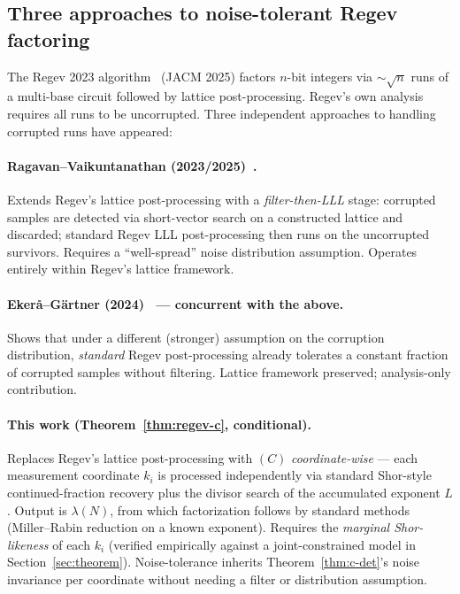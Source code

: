 \documentclass[11pt]{article}
\begin{document}
\subsection{Three approaches to noise-tolerant Regev factoring}

The Regev 2023 algorithm~\cite{regev2023} (JACM 2025) factors $n$-bit integers via $\sim \sqrt{n}$ runs of a multi-base circuit followed by lattice post-processing. Regev's own analysis requires all runs to be uncorrupted. Three independent approaches to handling corrupted runs have appeared:

\paragraph{Ragavan--Vaikuntanathan (2023/2025)~\cite{ragavan2023}.}
Extends Regev's lattice post-processing with a \emph{filter-then-LLL} stage: corrupted samples are detected via short-vector search on a constructed lattice and discarded; standard Regev LLL post-processing then runs on the uncorrupted survivors. Requires a ``well-spread'' noise distribution assumption. Operates entirely within Regev's lattice framework.

\paragraph{Ekerå--Gärtner (2024)~\cite{ekeragartner2024} --- concurrent with the above.}
Shows that under a different (stronger) assumption on the corruption distribution, \emph{standard} Regev post-processing already tolerates a constant fraction of corrupted samples without filtering. Lattice framework preserved; analysis-only contribution.

\paragraph{This work (Theorem~\ref{thm:regev-c}, conditional).}
Replaces Regev's lattice post-processing with $(C)$ \emph{coordinate-wise} --- each measurement coordinate $k_i$ is processed independently via standard Shor-style continued-fraction recovery plus the divisor search of the accumulated exponent $L$. Output is $\lambda(N)$, from which factorization follows by standard methods (Miller--Rabin reduction on a known exponent). Requires the \emph{marginal Shor-likeness} of each $k_i$ (verified empirically against a joint-constrained model in Section~\ref{sec:theorem}). Noise-tolerance inherits Theorem~\ref{thm:c-det}'s noise invariance per coordinate without needing a filter or distribution assumption.
\end{document}
